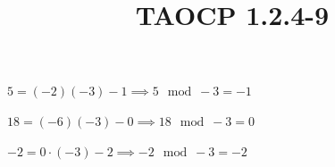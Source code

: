 \documentclass{article}
\title{TAOCP 1.2.4\mbox{-}9}
\begin{document}
\maketitle

\( 5 = (-2)(-3) - 1 \implies 5 \mod -3 = -1 \)

\( 18 = (-6)(-3) - 0 \implies 18 \mod -3 = 0 \)

\( -2 = 0 \cdot (-3) - 2 \implies -2 \mod -3 = -2 \)
\end{document}
